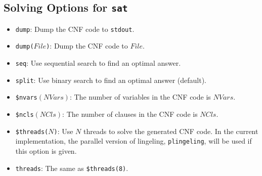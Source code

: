 \subsection{Solving Options for \texttt{sat}}
\begin{itemize}
\item \texttt{dump}: Dump the CNF code to \texttt{stdout}.
\item \texttt{dump($File$)}: Dump the CNF code to $File$.
\item \texttt{seq}: Use sequential search to find an optimal answer.
\item \texttt{split}: Use binary search to find an optimal answer (default).
\item \texttt{\$nvars$(NVars)$}: The number of variables in the CNF code is $NVars$.
\item \texttt{\$ncls$(NCls)$}: The number of clauses in the CNF code is $NCls$.
\item \texttt{\$threads($N$)}: Use $N$ threads to solve the generated CNF code. In the current implementation, the parallel version of lingeling, \texttt{plingeling}, will be used if this option is given.
\item \texttt{threads}: The same as \texttt{\$threads(8)}.
\end{itemize}

